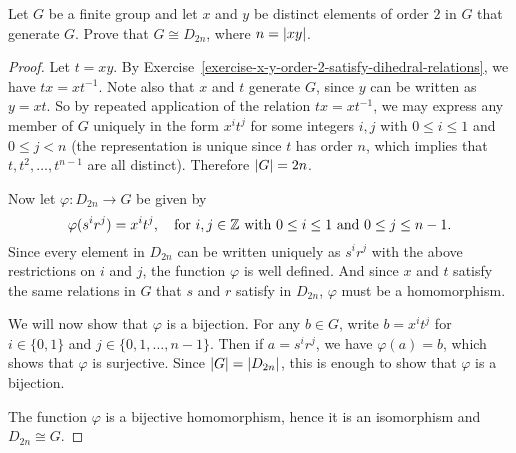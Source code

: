  Let $G$ be a finite group and let $x$ and $y$ be
distinct elements of order $2$ in $G$ that generate $G$. Prove that
$G\cong D_{2n}$, where $n = \lvert{xy}\rvert$.
\begin{proof}
  Let $t = xy$. By
  Exercise~\ref{exercise-x-y-order-2-satisfy-dihedral-relations}, we
  have $tx = xt^{-1}$. Note also that $x$ and $t$ generate $G$, since
  $y$ can be written as $y = xt$. So by repeated application of the
  relation $tx = xt^{-1}$, we may express any member of $G$ uniquely
  in the form $x^it^j$ for some integers $i,j$ with $0\leq i\leq1$ and
  $0\leq j<n$ (the representation is unique since $t$ has order $n$,
  which implies that $t, t^2, \dots, t^{n-1}$ are all
  distinct). Therefore $\lvert{G}\rvert = 2n$.

  Now let $\varphi\colon D_{2n}\to G$ be given by
  \begin{equation*}
    \varphi(s^ir^j) = x^it^j,
    \quad\text{for $i,j\in\mathbb{Z}$ with $0\leq i\leq1$ and $0\leq j\leq n-1$}.
  \end{equation*}
  Since every element in $D_{2n}$ can be written uniquely as $s^ir^j$
  with the above restrictions on $i$ and $j$, the function $\varphi$
  is well defined. And since $x$ and $t$ satisfy the same relations in
  $G$ that $s$ and $r$ satisfy in $D_{2n}$, $\varphi$ must be a
  homomorphism.

  We will now show that $\varphi$ is a bijection. For any $b\in G$,
  write $b = x^it^j$ for $i\in\{0,1\}$ and
  $j\in\{0,1,\dots,n-1\}$. Then if $a = s^ir^j$, we have
  $\varphi(a) = b$, which shows that $\varphi$ is surjective. Since
  $\lvert{G}\rvert = \lvert{D_{2n}}\rvert$, this is enough to show that $\varphi$ is a
  bijection.

  The function $\varphi$ is a bijective homomorphism, hence it is an
  isomorphism and $D_{2n}\cong G$.
\end{proof}
